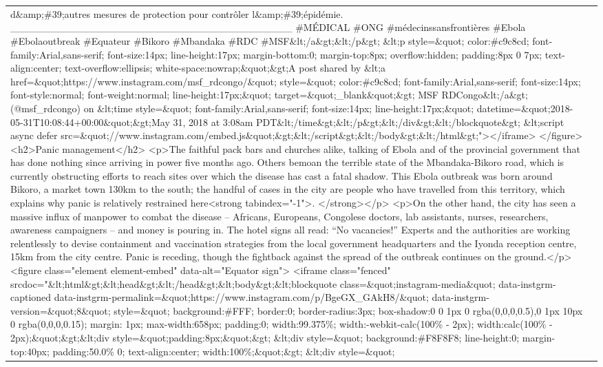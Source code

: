 \documentclass[]{article}
\begin{document}
\begin{table}[!h]
{\begin{tabular}[t]{ll}
d\&amp;\#39;autres mesures de protection pour contrôler l\&amp;\#39;épidémie. \_\_\_\_\_\_\_\_\_\_\_\_\_\_\_\_\_\_\_\_\_\_\_\_\_\_\_\_\_\_\_\_\_\_\_\_\_\_\_ \#MÉDICAL \#ONG \#médecinssansfrontières \#Ebola \#Ebolaoutbreak \#Equateur \#Bikoro \#Mbandaka \#RDC \#MSF\&lt;/a\&gt;\&lt;/p\&gt; \&lt;p style=\&quot; color:\#c9c8cd; font-family:Arial,sans-serif; font-size:14px; line-height:17px; margin-bottom:0; margin-top:8px; overflow:hidden; padding:8px 0 7px; text-align:center; text-overflow:ellipsis; white-space:nowrap;\&quot;\&gt;A post shared by \&lt;a href=\&quot;https://www.instagram.com/msf\_rdcongo/\&quot; style=\&quot; color:\#c9c8cd; font-family:Arial,sans-serif; font-size:14px; font-style:normal; font-weight:normal; line-height:17px;\&quot; target=\&quot;\_blank\&quot;\&gt; MSF RDCongo\&lt;/a\&gt; (@msf\_rdcongo) on \&lt;time style=\&quot; font-family:Arial,sans-serif; font-size:14px; line-height:17px;\&quot; datetime=\&quot;2018-05-31T10:08:44+00:00\&quot;\&gt;May 31, 2018 at 3:08am PDT\&lt;/time\&gt;\&lt;/p\&gt;\&lt;/div\&gt;\&lt;/blockquote\&gt; \&lt;script async defer src=\&quot;//www.instagram.com/embed.js\&quot;\&gt;\&lt;/script\&gt;\&lt;/body\&gt;\&lt;/html\&gt;"></iframe> </figure>  <h2>Panic management</h2> <p>The faithful pack bars and churches alike, talking of Ebola and of the provincial government that has done nothing since arriving in power five months ago. Others bemoan the terrible state of the Mbandaka-Bikoro road, which is currently obstructing efforts to reach sites over which the disease has cast a fatal shadow. This Ebola outbreak was born around Bikoro, a market town 130km to the south; the handful of cases in the city are people who have travelled from this territory, which explains why panic is relatively restrained here<strong tabindex="-1">. </strong></p> <p>On the other hand, the city has seen a massive influx of manpower to combat the disease – Africans, Europeans, Congolese doctors, lab assistants, nurses, researchers, awareness campaigners – and money is pouring in. The hotel signs all read: “No vacancies!” Experts and the authorities are working relentlessly to devise containment and vaccination strategies from the local government headquarters and the Iyonda reception centre, 15km from the city centre. Panic is receding, though the fightback against the spread of the outbreak continues on the ground.</p>  <figure class="element element-embed" data-alt="Equator sign">  <iframe class="fenced" srcdoc="\&lt;html\&gt;\&lt;head\&gt;\&lt;/head\&gt;\&lt;body\&gt;\&lt;blockquote class=\&quot;instagram-media\&quot; data-instgrm-captioned data-instgrm-permalink=\&quot;https://www.instagram.com/p/BgeGX\_GAkH8/\&quot; data-instgrm-version=\&quot;8\&quot; style=\&quot; background:\#FFF; border:0; border-radius:3px; box-shadow:0 0 1px 0 rgba(0,0,0,0.5),0 1px 10px 0 rgba(0,0,0,0.15); margin: 1px; max-width:658px; padding:0; width:99.375\%; width:-webkit-calc(100\% - 2px); width:calc(100\% - 2px);\&quot;\&gt;\&lt;div style=\&quot;padding:8px;\&quot;\&gt; \&lt;div style=\&quot; background:\#F8F8F8; line-height:0; margin-top:40px; padding:50.0\% 0; text-align:center; width:100\%;\&quot;\&gt; \&lt;div style=\&quot; 
\end{tabular}}
\end{table}
\end{document}
